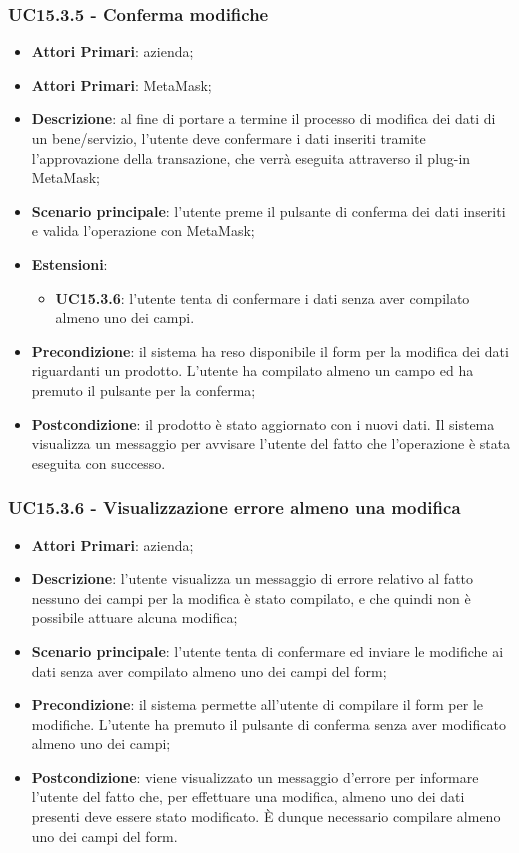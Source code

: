 \subsubsection{UC15.3.5 - Conferma modifiche}
\begin{itemize}
	\item \textbf{Attori Primari}: azienda;
	\item \textbf{Attori Primari}: MetaMask\glo;
	\item \textbf{Descrizione}: al fine di portare a termine il processo di modifica dei dati di un bene/servizio, l'utente deve confermare i dati inseriti tramite l'approvazione della transazione, che verrà eseguita attraverso il plug-in MetaMask\glo;
	\item \textbf{Scenario principale}: l'utente preme il pulsante di conferma dei dati inseriti e valida l'operazione con MetaMask\glo;
	\item \textbf{Estensioni}:
	\begin{itemize}
		\item \textbf{UC15.3.6}: l'utente tenta di confermare i dati senza aver compilato almeno uno dei campi.
	\end{itemize}
	\item \textbf{Precondizione}: il sistema ha reso disponibile il form per la modifica dei dati riguardanti un prodotto. L'utente ha compilato almeno un campo ed ha premuto il pulsante per la conferma;
	\item \textbf{Postcondizione}: il prodotto è stato aggiornato con i nuovi dati. Il sistema visualizza un messaggio per avvisare l'utente del fatto che l'operazione è stata eseguita con successo.
\end{itemize}


\subsubsection{UC15.3.6 - Visualizzazione errore almeno una modifica}
\begin{itemize}
	\item \textbf{Attori Primari}: azienda;
	\item \textbf{Descrizione}:
	l'utente visualizza un messaggio di errore relativo al fatto nessuno dei campi per la modifica è stato compilato, e che quindi non è possibile attuare alcuna modifica;
	\item \textbf{Scenario principale}: l'utente tenta di confermare ed inviare le modifiche ai dati senza aver compilato almeno uno dei campi del form;
	\item \textbf{Precondizione}: il sistema permette all'utente di compilare il form per le modifiche. L'utente ha premuto il pulsante di conferma senza aver modificato almeno uno dei campi; 
	\item \textbf{Postcondizione}:
	viene visualizzato un messaggio d'errore per informare l'utente del fatto che, per effettuare una modifica, almeno uno dei dati presenti deve essere stato modificato. È dunque necessario compilare almeno uno dei campi del form.
\end{itemize}

